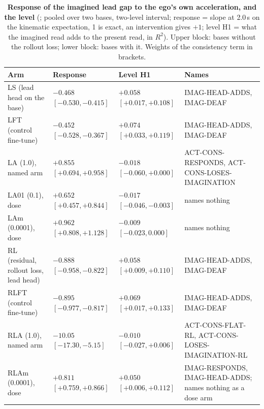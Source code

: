 \begin{table}[!tp]
\centering
\caption{\textbf{Response of the imagined lead gap to the ego's own acceleration, and the level} (; pooled over two bases, two-level interval; response = slope at 2.0\,s on the kinematic expectation, 1 is exact, an intervention gives $+1$; level H1 = what the imagined read adds to the present read, in $R^2$). Upper block: bases without the rollout loss; lower block: bases with it. Weights of the consistency term in brackets.}
\label{tab:imag}
\scriptsize
\begin{tabularx}{\textwidth}{@{}>{\raggedright\arraybackslash}p{40mm}>{\raggedright\arraybackslash}X>{\raggedright\arraybackslash}X>{\raggedright\arraybackslash}X@{}}
\toprule
Arm & Response & Level H1 & Names \\
\midrule
LS (lead head on the base) & $-0.468$ $[-0.530,-0.415]$ & $+0.058$ $[+0.017,+0.108]$ & IMAG-HEAD-ADDS, IMAG-DEAF \\
LFT (control fine-tune) & $-0.452$ $[-0.528,-0.367]$ & $+0.074$ $[+0.033,+0.119]$ & IMAG-HEAD-ADDS, IMAG-DEAF \\
LA (1.0), named arm & $+0.855$ $[+0.694,+0.958]$ & $-0.018$ $[-0.060,+0.000]$ & ACT-CONS-RESPONDS, ACT-CONS-LOSES-IMAGINATION \\
LA01 (0.1), dose & $+0.652$ $[+0.457,+0.844]$ & $-0.017$ $[-0.046,-0.003]$ & names nothing \\
LAm (0.0001), dose & $+0.962$ $[+0.808,+1.128]$ & $-0.009$ $[-0.023,0.000]$ & names nothing \\
\midrule
RL (residual, rollout loss, lead head) & $-0.888$ $[-0.958,-0.822]$ & $+0.058$ $[+0.009,+0.110]$ & IMAG-HEAD-ADDS, IMAG-DEAF \\
RLFT (control fine-tune) & $-0.895$ $[-0.977,-0.817]$ & $+0.069$ $[+0.017,+0.133]$ & IMAG-HEAD-ADDS, IMAG-DEAF \\
RLA (1.0), named arm & $-10.05$ $[-17.30,-5.15]$ & $-0.010$ $[-0.027,+0.006]$ & ACT-CONS-FLAT-RL, ACT-CONS-LOSES-IMAGINATION-RL \\
RLAm (0.0001), dose & $+0.811$ $[+0.759,+0.866]$ & $+0.050$ $[+0.006,+0.112]$ & IMAG-RESPONDS, IMAG-HEAD-ADDS; names nothing as a dose arm \\
\bottomrule
\end{tabularx}
\end{table}

